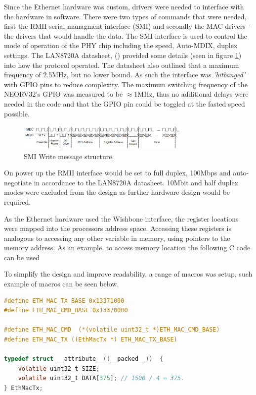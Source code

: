 Since the Ethernet hardware was custom, drivers were needed to interface with the hardware in software. There were two types of commands that were needed, first the RMII serial managment interface (SMI) and secondly the MAC drivers - the drivers that would handle the data.  The SMI interface is used to control the mode of operation of the PHY chip including the speed, Auto-MDIX, duplex settings. The LAN8720A datasheet, (\cite{LAN8720ADatasheet}) provided some details (seen in figure \ref{fig:smi_packet_structure}) into how the protocol operated. The datasheet also outlined that a maximum frequency of 2.5MHz, but no lower bound. As such the interface was \textit{'bitbanged'} with GPIO pins to reduce complexity. The maximum switching frequency of the NEORV32's GPIO was measured to be $\approx 1$MHz, thus no additional delays were needed in the code and that the GPIO pin could be toggled at the fasted speed possible. 


\begin{figure}[h!]
    \centering
    \includegraphics[width=0.75\textwidth]{Images/SMIWriteStructure.png}
    \caption[SMI Write message structure]{SMI Write message structure. \cite{LAN8720ADatasheet}}
    \label{fig:smi_packet_structure}
\end{figure}

On power up the RMII interface would be set to full duplex, 100Mbps and auto-negotiate in accordance to the LAN8720A datasheet. 10Mbit and half duplex modes were excluded from the design as further hardware design would be required.  


As the Ethernet hardware used the Wishbone interface, the register locations were mapped into the processors address space. Accessing these registers is analogous to accessing any other variable in memory, using pointers to the memory address. As an example, to access memory location  the following C code can be used 


To simplify the design and improve readability, a range of macros was setup, such example of macros can be seen below. 

\begin{lstlisting}[language=C, caption=Python example]
#define ETH_MAC_TX_BASE 0x13371000
#define ETH_MAC_CMD_BASE 0x13370000

#define ETH_MAC_CMD  (*(volatile uint32_t *)ETH_MAC_CMD_BASE)
#define ETH_MAC_TX ((EthMacTx *) ETH_MAC_TX_BASE)

typedef struct __attribute__((__packed__))  {
    volatile uint32_t SIZE;
    volatile uint32_t DATA[375]; // 1500 / 4 = 375.
} EthMacTx;
\end{lstlisting}

